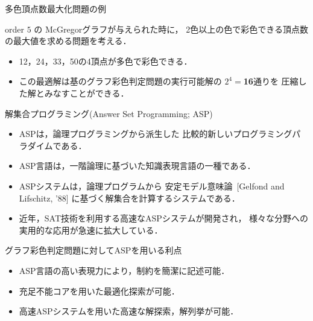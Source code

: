 \documentclass[dvipdfmx,11pt]{beamer}
\begin{document}
\begin{frame}{多色頂点数最大化問題の例}
\begin{exampleblock}{}
 order $5$ の McGregorグラフが与えられた時に，
 2色以上の色で彩色できる頂点数の最大値を求める問題を考える．%
\end{exampleblock}

\begin{alertblock}{}
 \begin{itemize}
  \item 12，24，33，50の4頂点が多色で彩色できる．
  \item この最適解は基のグラフ彩色判定問題の実行可能解の
        $2^4=$\alert{\textbf{16}}通りを
        圧縮した解とみなすことができる．%
 \end{itemize}
\end{alertblock}

\end{frame}


\begin{frame}{解集合プログラミング(Answer Set Programming; ASP)}

 \begin{itemize}
  \item \alert{ASP}は，論理プログラミングから派生した
        比較的新しいプログラミングパラダイムである．
  \item \alert{ASP言語}は，一階論理に基づいた知識表現言語の一種である．
  \item \alert{ASPシステム}は，論理プログラムから
        安定モデル意味論~{\scriptsize[Gelfond and Lifschitz, '88]}
        に基づく解集合を計算するシステムである．
  \item 近年，SAT技術を利用する高速なASPシステムが開発され，
        様々な分野への実用的な応用が急速に拡大している．
 \end{itemize}
 
 \begin{alertblock}{グラフ彩色判定問題に対してASPを用いる利点}
  \begin{itemize}
   \item ASP言語の高い表現力により，制約を簡潔に記述可能．
   \item 充足不能コアを用いた最適化探索が可能．
   \item 高速ASPシステムを用いた高速な解探索，解列挙が可能．
  \end{itemize}
 \end{alertblock}
 
\end{frame}
\end{document}
